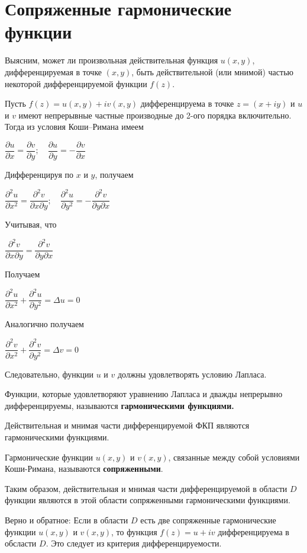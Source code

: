 \documentclass[a4paper, 12pt]{report}
\begin{document}
\section{Сопряженные гармонические функции}
Выясним, может ли произвольная действительная функция $u(x,y)$, дифференцируемая в точке $(x,y)$, быть действительной (или мнимой) частью некоторой дифференцируемой функции $f(z)$.
\par\bigskip
Пусть $f(z) = u(x, y) + iv(x, y)$ дифференцируема в точке $z = (x + iy)$ и $u$ и $v$ имеют непрерывные частные производные до 2-ого порядка включительно. Тогда из условия Коши--Римана имеем
\begin{center}
    $\dfrac{\partial u}{\partial x} = \dfrac{\partial v}{\partial y}; \quad \dfrac{\partial u}{\partial y} = -\dfrac{\partial v}{\partial x}$
\end{center}
Дифференцируя по $x$ и $y$, получаем
\begin{center}
    $\dfrac{\partial^2 u}{\partial x^2} = \dfrac{\partial^2 v}{\partial x \partial y}; \quad \dfrac{\partial^2 u}{\partial y^2} = -\dfrac{\partial^2 v}{\partial y \partial x}$
\end{center}
Учитывая, что 
\begin{center}
    $\dfrac{\partial^2 v}{\partial x \partial y} = \dfrac{\partial^2 v}{\partial y \partial x}$
\end{center}
Получаем 
\begin{center}
    $\dfrac{\partial^2 u}{\partial x^2} + \dfrac{\partial^2 u}{\partial y^2} = \Delta u = 0$
\end{center}
Аналогично получаем
\begin{center}
    $\dfrac{\partial^2 v}{\partial x^2} + \dfrac{\partial^2 v}{\partial y^2} = \Delta v = 0$
\end{center}
Следовательно, функции $u$ и $v$ должны удовлетворять условию Лапласа.

\par\bigskip
Функции, которые удовлетворяют уравнению Лапласа и дважды непрерывно дифференцируемы, называются \textbf{гармоническими функциями.}
\par\bigskip
Действительная и мнимая части дифференцируемой ФКП являются гармоническими функциями.
\par\bigskip
Гармонические функции $u(x, y)$ и $v(x, y)$, связанные между собой условиями Коши-Римана, называются \textbf{сопряженными}.
\par\bigskip
Таким образом, действительная и мнимая части дифференцируемой в области $D$ функции являются в этой области сопряженными гармоническими функциями. 
\par\bigskip
Верно и обратное: Если в области $D$ есть две сопряженные гармонические функции $u(x, y)$ и $v(x, y)$, то функция $f(z) = u + iv$ дифференцируема в обсласти $D$. Это следует из критерия дифференцируемости.
\par\bigskip
\end{document}
